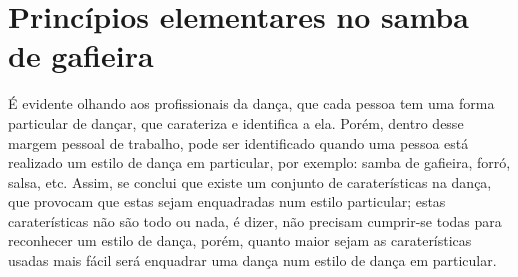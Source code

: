 \section{Princípios elementares no samba de gafieira}
\label{sec:principiosambagafieira}

É evidente olhando aos profissionais da dança,
que cada pessoa tem uma forma particular de dançar, 
que carateriza e identifica a ela. Porém, 
dentro desse margem pessoal de trabalho, 
pode ser identificado quando uma pessoa está realizado um estilo de dança em particular,
por exemplo: samba de gafieira, forró, salsa, etc.
Assim, se conclui que existe um conjunto de caraterísticas na dança,
que provocam que estas sejam enquadradas num estilo particular;
estas caraterísticas não são todo ou nada, é dizer, 
não precisam cumprir-se todas para reconhecer um estilo de dança,
porém, quanto maior sejam as caraterísticas usadas mais fácil será enquadrar uma dança num estilo de dança em particular.

